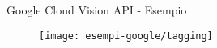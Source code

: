 %
\begin{frame}[t]{Google Cloud Vision API - Esempio}
	\begin{figure}[h]
	\centering
	    \texttt{[image: esempi-google/tagging]}
		\label{fig:esempio-google}
	\end{figure}
\end{frame}
%
